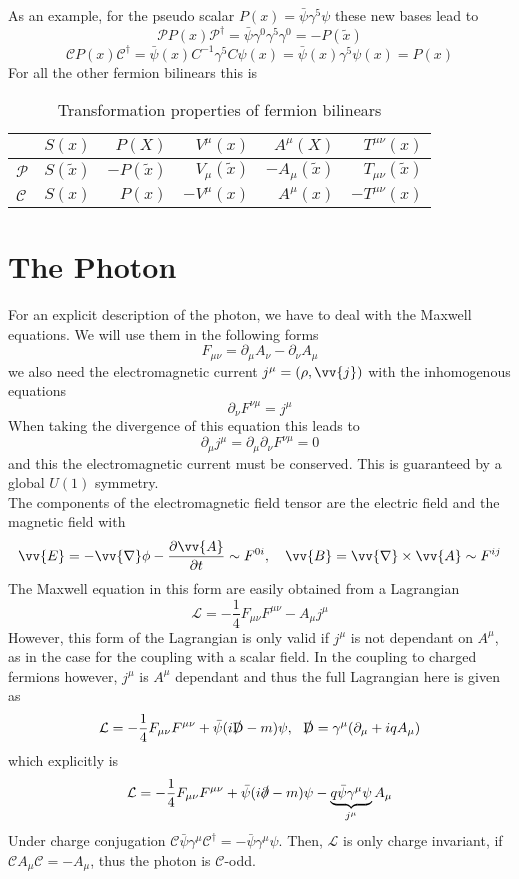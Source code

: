 \documentclass{include/thesisclass}
\newcommand{\LL}{\mathcal{L}}
\newcommand{\Dd}{{\rm D}}
\newcommand{\p}{\partial}
\newcommand{\vn}{\vv{\nabla}}
\begin{document}
As an example, for the pseudo scalar $P(x) = \bar \psi \gamma^5 \psi$ these new bases lead to
\[\mathcal P P(x) \mathcal P^\dagger = \bar \psi \gamma^0 \gamma^5 \gamma^0 = - P(\tilde x)\]
\[\mathcal C P(x) \mathcal C^\dagger = \bar \psi(x) C^{-1} \gamma^5 C \psi(x) = \bar \psi(x) \gamma^5 \psi(x) = P(x)\]
For all the other fermion bilinears this is
\begin{table}[H]
\centering
\begin{tabular}{l|rrrrr}
&$S(x)$&$P(X)$&$V^\mu(x)$&$A^\mu(X)$&$T^{\mu\nu}(x)$\\
\midrule
$\mathcal P$ & $S(\tilde x)$ & $-P(\tilde x)$ & $V_\mu(\tilde x)$&$-A_\mu(\tilde x)$&$ T_{\mu\nu}(\tilde x)$\\
$\mathcal C$&$ S(x) $&$ P(x) $&$ - V^\mu(x) $&$ A^\mu(x) $&$ - T^{\mu\nu}(x) $\\
\end{tabular}
\caption{Transformation properties of fermion bilinears}
\end{table}



\section{The Photon}
For an explicit description of the photon, we have to deal with the Maxwell equations.
We will use them in the following forms
\[ F_{\mu\nu} = \p_\mu A_\nu - \p_\nu A_\mu\]
we also need the electromagnetic current $j^\mu = ( \rho, \vv{j})$ with the inhomogenous equations
\[ \p_\nu F^{\nu\mu} = j ^\mu\]
When taking the divergence of this equation this leads to
\[ \p_\mu j^\mu = \p_\mu \p_\nu F^{\nu\mu} = 0\]
and this the electromagnetic current must be conserved. This is guaranteed by a global $U(1)$ symmetry.\\
The components of the electromagnetic field tensor are the electric field and the magnetic field with
\[ \vv{E} = - \vn \phi - \frac{\p \vv{A}}{\p t} \sim F^{0i}, ~~~ \vv{B} = \vn \times \vv{A} \sim F^{ij}\]
The Maxwell equation in this form are easily obtained from a Lagrangian
\[ \LL = -\frac{1}{4} F_{\mu\nu}F^{\mu\nu} - A_\mu j^\mu\]
However, this form of the Lagrangian is only valid if $j^\mu$ is not dependant on $A^\mu$, as in the case for the coupling with a scalar field. 
In the coupling to charged fermions however, $j^\mu$ is $A^\mu$ dependant and thus the full Lagrangian here is given as
\[ \LL = - \frac{1}{4} F_{\mu\nu}F^{\mu\nu} + \bar \psi ( i \slashed \Dd - m) \psi, ~~ \slashed \Dd = \gamma^\mu( \p_\mu + i q A_\mu)\]
which explicitly is
\[ \LL = - \frac{1}{4} F_{\mu\nu}F^{\mu\nu} + \bar \psi( i \slashed \p - m) \psi - \underbrace{q \bar \psi \gamma^\mu \psi}_{j^\mu}A_\mu\]
Under charge conjugation $\mathcal{C} \bar \psi \gamma^\mu \mathcal{C}^\dagger = - \bar \psi \gamma^\mu \psi$.
Then, $\LL$ is only charge invariant, if $\mathcal C A_\mu \mathcal C = - A_\mu$, thus the photon is $\mathcal C$-odd.
\end{document}

